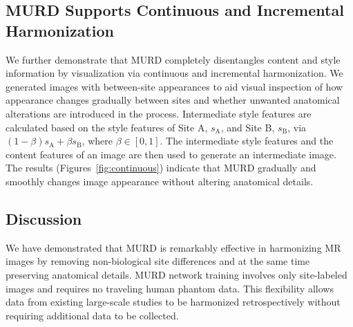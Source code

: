 \documentclass{nature}
\begin{document}
\subsection{MURD Supports Continuous and Incremental Harmonization}
We further demonstrate that MURD completely disentangles content and style information by visualization via continuous and incremental harmonization.
We generated images with between-site appearances to aid visual inspection of how appearance changes gradually between sites and whether unwanted anatomical alterations are introduced in the process.
Intermediate style features are calculated based on the style features of Site A, $s_\text{A}$, and Site B, $s_\text{B}$, via $(1-\beta)s_\text{A}+\beta s_\text{B}$, where $\beta\in [0,1]$.
The intermediate style features and the content features of an image are then used to generate an intermediate image. 
The results (Figures~\ref{fig:continuous}) indicate that MURD gradually and smoothly changes image appearance without altering anatomical details.

\subsection{Discussion}
We have demonstrated that MURD is remarkably effective in harmonizing MR images by removing non-biological site differences and at the same time preserving anatomical details. MURD network training involves only site-labeled images and requires no traveling human phantom data. This flexibility allows data from existing large-scale studies to be harmonized retrospectively without requiring additional data to be collected.
\end{document}
